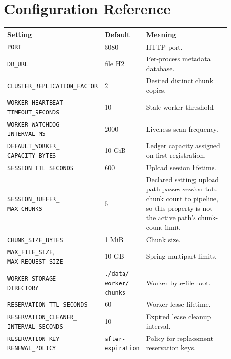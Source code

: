 \documentclass[11pt,a4paper]{article}
\begin{document}
\section{Configuration Reference}
\begin{longtable}{p{0.34\linewidth}p{0.12\linewidth}p{0.45\linewidth}}
\toprule \textbf{Setting} & \textbf{Default} & \textbf{Meaning}\\ \midrule
\endhead
\texttt{PORT} & 8080 & HTTP port.\\
\texttt{DB\_URL} & file H2 & Per-process metadata database.\\
\texttt{CLUSTER\_REPLICATION\_FACTOR} & 2 & Desired distinct chunk copies.\\
\makecell[l]{\texttt{WORKER\_HEARTBEAT\_}\\\texttt{TIMEOUT\_SECONDS}} & 10 & Stale-worker threshold.\\
\makecell[l]{\texttt{WORKER\_WATCHDOG\_}\\\texttt{INTERVAL\_MS}} & 2000 & Liveness scan frequency.\\
\makecell[l]{\texttt{DEFAULT\_WORKER\_}\\\texttt{CAPACITY\_BYTES}} & 10 GiB & Ledger capacity assigned on first registration.\\
\texttt{SESSION\_TTL\_SECONDS} & 600 & Upload session lifetime.\\
\makecell[l]{\texttt{SESSION\_BUFFER\_}\\\texttt{MAX\_CHUNKS}} & 5 & Declared setting; upload path passes session total chunk count to pipeline, so this property is not the active path's chunk-count limit.\\
\texttt{CHUNK\_SIZE\_BYTES} & 1 MiB & Chunk size.\\
\makecell[l]{\texttt{MAX\_FILE\_SIZE},\\\texttt{MAX\_REQUEST\_SIZE}} & 10 GB & Spring multipart limits.\\
\makecell[l]{\texttt{WORKER\_STORAGE\_}\\\texttt{DIRECTORY}} & \makecell[l]{\texttt{./data/}\\\texttt{worker/}\\\texttt{chunks}} & Worker byte-file root.\\
\texttt{RESERVATION\_TTL\_SECONDS} & 60 & Worker lease lifetime.\\
\makecell[l]{\texttt{RESERVATION\_CLEANER\_}\\\texttt{INTERVAL\_SECONDS}} & 10 & Expired lease cleanup interval.\\
\makecell[l]{\texttt{RESERVATION\_KEY\_}\\\texttt{RENEWAL\_POLICY}} & \makecell[l]{\texttt{after-}\\\texttt{expiration}} & Policy for replacement reservation keys.\\

\end{longtable}
\end{document}
